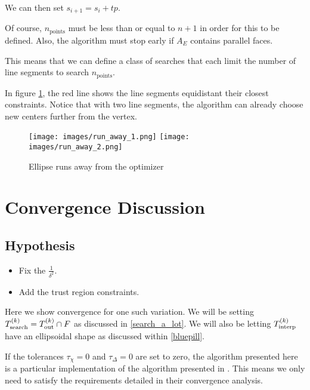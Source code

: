 We can then set $s_{i+1} = s_{i} + t p$.

Of course, $n_{\text{points}}$ must be less than or equal to $n + 1$ in order for this to be defined.
Also, the algorithm must stop early if $A_E$ contains parallel faces.



This means that we can define a class of searches that each limit the number of line segments to search $n_{\text{points}}$.

In figure \cref{line_can_run}, the red line shows the line segments equidistant their closest constraints.
Notice that with two line segments, the algorithm can already choose new centers further from the vertex.

\begin{figure}[h]
    \centering
    \texttt{[image: images/run\_away\_1.png]}
    \texttt{[image: images/run\_away\_2.png]}
    \caption{Ellipse runs away from the optimizer}
    \label{line_can_run}
\end{figure}




\section{Convergence Discussion}
\label{convergence_discussion}

\subsection{Hypothesis}

\color{red}
\begin{itemize}
\item Fix the $\frac{1}{\delta^2}$.
\item Add the trust region constraints.
\end{itemize}
\color{black}

Here we show convergence for one such variation.
We will be setting ${T_{\text{search}}^{(k)}} = {T_{\text{out}}^{(k)}} \cap {F}$ as discussed in \cref{search_a_lot}.
We will also be letting ${T_{\text{interp}}^{(k)}}$ have an ellipsoidal shape as discussed within \cref{bluepill}. 

If the tolerances $\tau_{\chi} = 0$ and $\tau_{\Delta} = 0$ are set to zero, the algorithm presented here is a particular implementation of the algorithm presented in \cite{doi:10.1080/10556788.2015.1026968}.
This means we only need to satisfy the requirements detailed in their convergence analysis.


